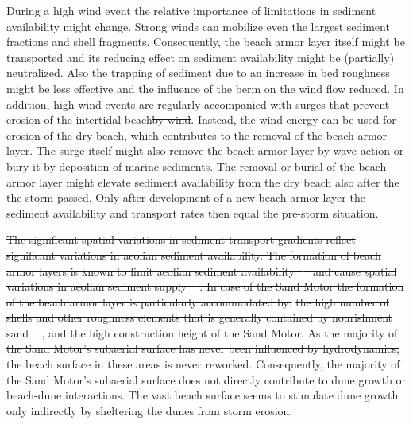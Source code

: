 \documentclass[preprint,12pt,authoryear,a4paper]{elsarticle}
\providecommand{\DIFadd}[1]{{\protect\color{blue}\uwave{#1}}} %
\providecommand{\DIFdel}[1]{{\protect\color{red}\sout{#1}}}                      %
\providecommand{\DIFaddbegin}{} %
\providecommand{\DIFaddend}{} %
\providecommand{\DIFdelbegin}{} %
\providecommand{\DIFdelend}{} %
\begin{document}
\DIFdelbegin %

\DIFdelend During a high wind event the relative importance of limitations in
sediment availability might change. Strong winds can mobilize even the
largest sediment fractions and shell fragments. Consequently, the
beach armor layer itself might be transported and its reducing effect
on sediment availability might be (partially) neutralized. Also the
trapping of sediment due to an increase in bed roughness might be less
effective and the influence of the berm on the wind flow reduced. In
addition, high wind events are regularly accompanied with surges that
prevent \DIFaddbegin \DIFadd{wind }\DIFaddend erosion of the intertidal beach\DIFdelbegin \DIFdel{by wind}\DIFdelend . Instead, the wind energy
can be used for erosion of the dry beach, which contributes to the
removal of the beach armor layer. The surge itself might also remove
the beach armor layer by wave action or bury it by deposition of
marine sediments. The removal or burial of the beach armor layer might
elevate sediment availability from the dry beach also after the the
storm passed. Only after development of a new beach armor layer the
sediment availability and transport rates then equal the pre-storm
situation.

\DIFdelbegin \DIFdel{The significant spatial variations in sediment transport gradients
reflect significant variations in aeolian sediment availability. The
formation of beach armor layers is known to limit aeolian sediment
availability \mbox{%
\citep{McKennaNeuman2012} }%
and cause spatial variations in
aeolian sediment supply \mbox{%
\citep{Jackson2010}}%
. In case of the Sand Motor
the formation of the beach armor layer is particularly accommodated
by:
}%
\DIFdel{the high number of shells and other roughness elements that is
  generally contained by nourishment sand \mbox{%
\citep{VanDerWal1998,
    VanDerWal2000}}%
, and
}%
\DIFdel{the high construction height of the Sand Motor.
}%
\DIFdel{As the majority of the Sand Motor's subaerial surface has never been
influenced by hydrodynamics, the beach surface in these areas is never
reworked. Consequently, the majority of the Sand Motor's subaerial
surface does not directly contribute to dune growth or beach-dune
interactions. The vast beach surface seems to stimulate dune growth
only indirectly by sheltering the dunes from storm erosion.
}%
\end{document}
